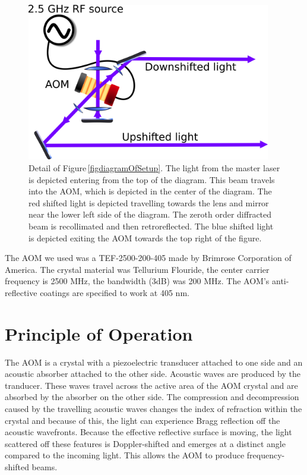 \begin{figure}
\centerline{
\includegraphics[width=0.95\textwidth]{diagramOfAOM}}
\caption[AOM diagram]{\label{aomDiagramDetail} Detail of Figure\,\ref{figdiagramOfSetup}. The light from the master laser is depicted entering from the top of the diagram. This beam travels into the AOM, which is depicted in the center of the diagram. The red shifted light is depicted travelling towards the lens and mirror near the lower left side of the diagram. The zeroth order diffracted beam is recollimated and then retroreflected. The blue shifted light is depicted exiting the AOM towards the top right of the figure.}
\end{figure}

The AOM we used was a TEF-2500-200-405 made by Brimrose Corporation of America. The crystal material was Tellurium Flouride, the center carrier frequency is 2500 MHz, the bandwidth (3dB) was 200 MHz. The AOM's anti-reflective coatings are specified to work at 405 nm. 
\section{Principle of Operation}

The AOM is a crystal with a piezoelectric transducer attached to one side and an acoustic absorber attached to the other side. Acoustic waves are produced by the tranducer. These waves travel across the active area of the AOM crystal and are absorbed by the absorber on the other side. The compression and decompression caused by the travelling acoustic waves changes the index of refraction within the crystal and because of this, the light can experience Bragg reflection off the acoustic wavefronts. Because the effective reflective surface is moving, the light scattered off these features is Doppler-shifted and emerges at a distinct angle compared to the incoming light. This allows the AOM to produce frequency-shifted beams. 

